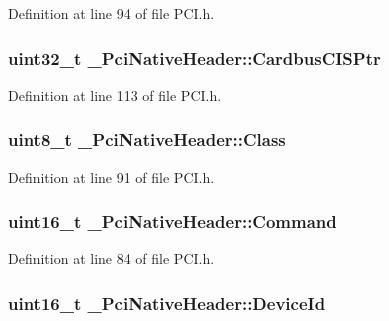 Definition at line 94 of file P\+C\+I.\+h.

\subsubsection[{\texorpdfstring{Cardbus\+C\+I\+S\+Ptr}{CardbusCISPtr}}]{\setlength{\rightskip}{0pt plus 5cm}uint32\+\_\+t \+\_\+\+Pci\+Native\+Header\+::\+Cardbus\+C\+I\+S\+Ptr}\hypertarget{struct__PciNativeHeader_a229757839cd81fceafa182234d1ec930}{}\label{struct__PciNativeHeader_a229757839cd81fceafa182234d1ec930}


Definition at line 113 of file P\+C\+I.\+h.

\subsubsection[{\texorpdfstring{Class}{Class}}]{\setlength{\rightskip}{0pt plus 5cm}uint8\+\_\+t \+\_\+\+Pci\+Native\+Header\+::\+Class}\hypertarget{struct__PciNativeHeader_a2feb2dca74bf9ff2af1e08ebbb310241}{}\label{struct__PciNativeHeader_a2feb2dca74bf9ff2af1e08ebbb310241}


Definition at line 91 of file P\+C\+I.\+h.

\subsubsection[{\texorpdfstring{Command}{Command}}]{\setlength{\rightskip}{0pt plus 5cm}uint16\+\_\+t \+\_\+\+Pci\+Native\+Header\+::\+Command}\hypertarget{struct__PciNativeHeader_a81ce29fa9d9c0c10e6dd3694171a4c26}{}\label{struct__PciNativeHeader_a81ce29fa9d9c0c10e6dd3694171a4c26}


Definition at line 84 of file P\+C\+I.\+h.

\subsubsection[{\texorpdfstring{Device\+Id}{DeviceId}}]{\setlength{\rightskip}{0pt plus 5cm}uint16\+\_\+t \+\_\+\+Pci\+Native\+Header\+::\+Device\+Id}\hypertarget{struct__PciNativeHeader_a4cb00b77b64768cc8754c3b5938a09ea}{}\label{struct__PciNativeHeader_a4cb00b77b64768cc8754c3b5938a09ea}


